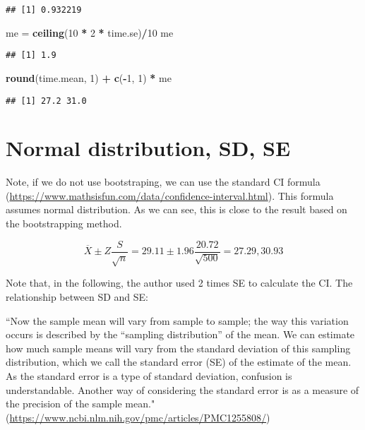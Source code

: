\documentclass[]{book}
\newenvironment{Shaded}{\begin{snugshade}}{\end{snugshade}}
\newcommand{\DecValTok}[1]{\textcolor[rgb]{0.00,0.00,0.81}{#1}}
\newcommand{\KeywordTok}[1]{\textcolor[rgb]{0.13,0.29,0.53}{\textbf{#1}}}
\newcommand{\NormalTok}[1]{#1}
\newcommand{\OperatorTok}[1]{\textcolor[rgb]{0.81,0.36,0.00}{\textbf{#1}}}
\newcommand{\StringTok}[1]{\textcolor[rgb]{0.31,0.60,0.02}{#1}}
\begin{document}
\begin{verbatim}
## [1] 0.932219
\end{verbatim}

\begin{Shaded}
\begin{Highlighting}[]
\NormalTok{me =}\StringTok{ }\KeywordTok{ceiling}\NormalTok{(}\DecValTok{10} \OperatorTok{*}\StringTok{ }\DecValTok{2} \OperatorTok{*}\StringTok{ }\NormalTok{time.se)}\OperatorTok{/}\DecValTok{10}
\NormalTok{me}
\end{Highlighting}
\end{Shaded}

\begin{verbatim}
## [1] 1.9
\end{verbatim}

\begin{Shaded}
\begin{Highlighting}[]
\KeywordTok{round}\NormalTok{(time.mean, }\DecValTok{1}\NormalTok{) }\OperatorTok{+}\StringTok{ }\KeywordTok{c}\NormalTok{(}\OperatorTok{-}\DecValTok{1}\NormalTok{, }\DecValTok{1}\NormalTok{) }\OperatorTok{*}\StringTok{ }\NormalTok{me}
\end{Highlighting}
\end{Shaded}

\begin{verbatim}
## [1] 27.2 31.0
\end{verbatim}

\hypertarget{normal-distribution-sd-se}{%
\section{Normal distribution, SD, SE}\label{normal-distribution-sd-se}}

Note, if we do not use bootstraping, we can use the standard CI formula (\url{https://www.mathsisfun.com/data/confidence-interval.html}). This formula assumes normal distribution. As we can see, this is close to the result based on the bootstrapping method.

\[\overline{X} \pm Z \frac{S}{\sqrt{n}}=29.11 \pm 1.96 \frac{20.72}{\sqrt{500}}=27.29, 30.93\]

Note that, in the following, the author used 2 times SE to calculate the CI. The relationship between SD and SE:

``Now the sample mean will vary from sample to sample; the way this variation occurs is described by the ``sampling distribution'' of the mean. We can estimate how much sample means will vary from the standard deviation of this sampling distribution, which we call the standard error (SE) of the estimate of the mean. As the standard error is a type of standard deviation, confusion is understandable. Another way of considering the standard error is as a measure of the precision of the sample mean." (\url{https://www.ncbi.nlm.nih.gov/pmc/articles/PMC1255808/})
\end{document}
